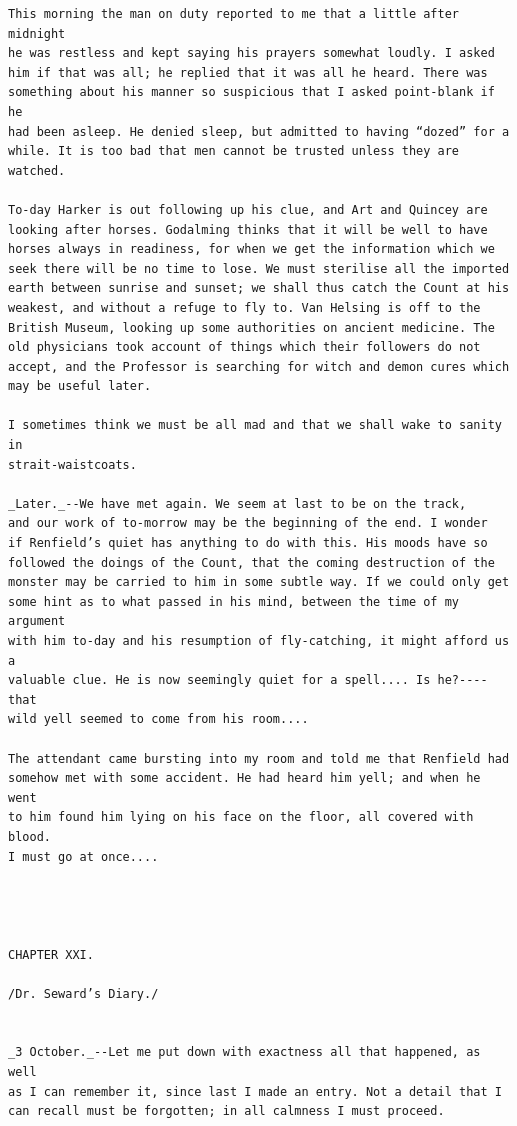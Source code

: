 \documentclass{article}
\begin{document}
\begin{verbatim}
This morning the man on duty reported to me that a little after midnight
he was restless and kept saying his prayers somewhat loudly. I asked
him if that was all; he replied that it was all he heard. There was
something about his manner so suspicious that I asked point-blank if he
had been asleep. He denied sleep, but admitted to having “dozed” for a
while. It is too bad that men cannot be trusted unless they are watched.

To-day Harker is out following up his clue, and Art and Quincey are
looking after horses. Godalming thinks that it will be well to have
horses always in readiness, for when we get the information which we
seek there will be no time to lose. We must sterilise all the imported
earth between sunrise and sunset; we shall thus catch the Count at his
weakest, and without a refuge to fly to. Van Helsing is off to the
British Museum, looking up some authorities on ancient medicine. The
old physicians took account of things which their followers do not
accept, and the Professor is searching for witch and demon cures which
may be useful later.

I sometimes think we must be all mad and that we shall wake to sanity in
strait-waistcoats.

_Later._--We have met again. We seem at last to be on the track,
and our work of to-morrow may be the beginning of the end. I wonder
if Renfield’s quiet has anything to do with this. His moods have so
followed the doings of the Count, that the coming destruction of the
monster may be carried to him in some subtle way. If we could only get
some hint as to what passed in his mind, between the time of my argument
with him to-day and his resumption of fly-catching, it might afford us a
valuable clue. He is now seemingly quiet for a spell.... Is he?---- that
wild yell seemed to come from his room....

The attendant came bursting into my room and told me that Renfield had
somehow met with some accident. He had heard him yell; and when he went
to him found him lying on his face on the floor, all covered with blood.
I must go at once....




CHAPTER XXI.

/Dr. Seward’s Diary./


_3 October._--Let me put down with exactness all that happened, as well
as I can remember it, since last I made an entry. Not a detail that I
can recall must be forgotten; in all calmness I must proceed.


\end{verbatim}
\end{document}
